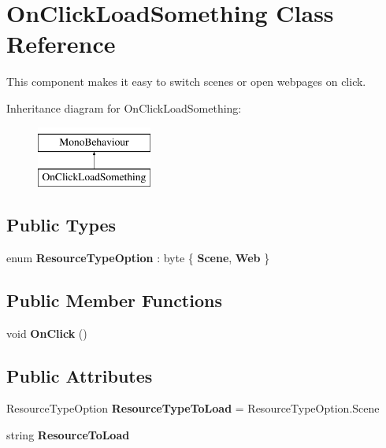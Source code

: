\hypertarget{class_on_click_load_something}{}\section{On\+Click\+Load\+Something Class Reference}
\label{class_on_click_load_something}


This component makes it easy to switch scenes or open webpages on click.  


Inheritance diagram for On\+Click\+Load\+Something\+:\begin{figure}[H]
\begin{center}
\leavevmode
\includegraphics[height=2.000000cm]{class_on_click_load_something}
\end{center}
\end{figure}
\subsection*{Public Types}
\begin{DoxyCompactItemize}
\item 
enum {\bfseries Resource\+Type\+Option} \+: byte \{ {\bfseries Scene}, 
{\bfseries Web}
 \}\hypertarget{class_on_click_load_something_a43b622b02426c42ad0c1f841dcaef1ba}{}\label{class_on_click_load_something_a43b622b02426c42ad0c1f841dcaef1ba}

\end{DoxyCompactItemize}
\subsection*{Public Member Functions}
\begin{DoxyCompactItemize}
\item 
void {\bfseries On\+Click} ()\hypertarget{class_on_click_load_something_af1512a2aa80938655fd4f50b93f401b6}{}\label{class_on_click_load_something_af1512a2aa80938655fd4f50b93f401b6}

\end{DoxyCompactItemize}
\subsection*{Public Attributes}
\begin{DoxyCompactItemize}
\item 
Resource\+Type\+Option {\bfseries Resource\+Type\+To\+Load} = Resource\+Type\+Option.\+Scene\hypertarget{class_on_click_load_something_ac8ae07ff76e4759f49d73d931a46ad11}{}\label{class_on_click_load_something_ac8ae07ff76e4759f49d73d931a46ad11}

\item 
string {\bfseries Resource\+To\+Load}\hypertarget{class_on_click_load_something_ae51a4e24aa18f52c1c36df756c2aaab7}{}\label{class_on_click_load_something_ae51a4e24aa18f52c1c36df756c2aaab7}

\end{DoxyCompactItemize}


